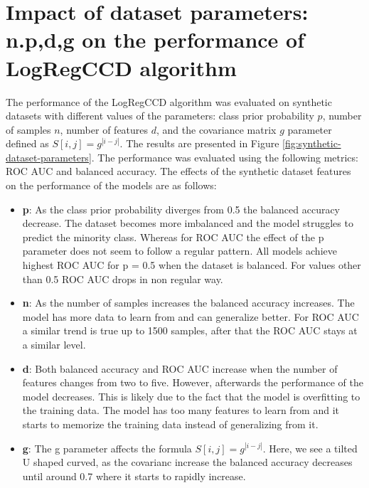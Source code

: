 \documentclass[12pt]{article}
\begin{document}
\section{Impact of dataset parameters: n.p,d,g on the performance of LogRegCCD algorithm}

The performance of the LogRegCCD algorithm was evaluated on synthetic datasets with different values of the parameters: class prior probability $p$, number of samples $n$, number of features $d$, and the covariance matrix $g$ parameter defined as $S[i,j] = g^{|i-j|}$. The results are presented in Figure \ref{fig:synthetic-dataset-parameters}. The performance was evaluated using the following metrics: ROC AUC and balanced accuracy. The effects of the synthetic dataset features on the performance of the models are as follows:


\begin{itemize}
    \item \textbf{p}: As the class prior probability diverges from 0.5 the balanced accuracy decrease. The dataset becomes more imbalanced and the model struggles to predict the minority class. Whereas for ROC AUC the effect of the p parameter does not seem to follow a regular pattern. All models achieve highest ROC AUC for p = 0.5 when the dataset is balanced. For values other than 0.5 ROC AUC drops in non regular way.
    \item \textbf{n}: As the number of samples increases the balanced accuracy increases. The model has more data to learn from and can generalize better. For ROC AUC a similar trend is true up to 1500 samples, after that the ROC AUC stays at a similar level.
    \item \textbf{d}: Both balanced accuracy and ROC AUC increase when the number of features changes from two to five. However, afterwards the performance of the model decreases. This is likely due to the fact that the model is overfitting to the training data. The model has too many features to learn from and it starts to memorize the training data instead of generalizing from it.
    \item \textbf{g}: The g parameter affects the formula $S[i,j] = g^{|i-j|}$. Here, we see a tilted U shaped curved, as the covarianc increase the balanced accuracy decreases until around 0.7 where it starts to rapidly increase.
\end{itemize}
\end{document}

